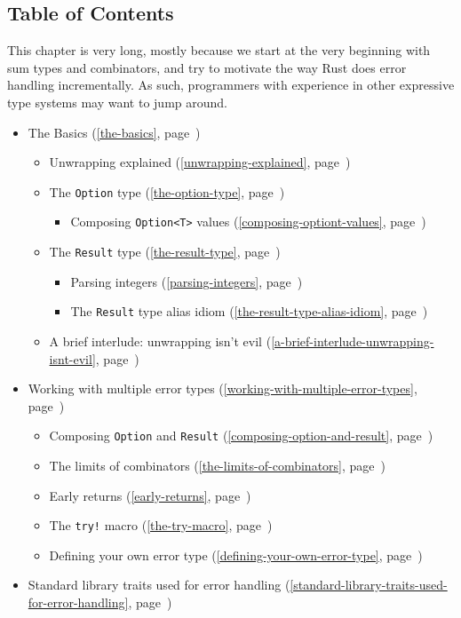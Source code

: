 \documentclass[a4paper,]{book}
\renewcommand*{\hyperref}[2][\ar]{%
  \def\ar{#2}%
  #2 (\autoref{#1}, page~\pageref{#1})}
\providecommand{\tightlist}{%
  \setlength{\itemsep}{0pt}\setlength{\parskip}{0pt}}
\begin{document}
\subsection{Table of Contents}\label{table-of-contents}

This chapter is very long, mostly because we start at the very beginning
with sum types and combinators, and try to motivate the way Rust does
error handling incrementally. As such, programmers with experience in
other expressive type systems may want to jump around.

\begin{itemize}
\tightlist
\item
  \hyperref[the-basics]{The Basics}

  \begin{itemize}
  \tightlist
  \item
    \hyperref[unwrapping-explained]{Unwrapping explained}
  \item
    \hyperref[the-option-type]{The \texttt{Option} type}

    \begin{itemize}
    \tightlist
    \item
      \hyperref[composing-optiont-values]{Composing
      \texttt{Option\textless{}T\textgreater{}} values}
    \end{itemize}
  \item
    \hyperref[the-result-type]{The \texttt{Result} type}

    \begin{itemize}
    \tightlist
    \item
      \hyperref[parsing-integers]{Parsing integers}
    \item
      \hyperref[the-result-type-alias-idiom]{The \texttt{Result} type
      alias idiom}
    \end{itemize}
  \item
    \hyperref[a-brief-interlude-unwrapping-isnt-evil]{A brief interlude:
    unwrapping isn't evil}
  \end{itemize}
\item
  \hyperref[working-with-multiple-error-types]{Working with multiple
  error types}

  \begin{itemize}
  \tightlist
  \item
    \hyperref[composing-option-and-result]{Composing \texttt{Option} and
    \texttt{Result}}
  \item
    \hyperref[the-limits-of-combinators]{The limits of combinators}
  \item
    \hyperref[early-returns]{Early returns}
  \item
    \hyperref[the-try-macro]{The \texttt{try!} macro}
  \item
    \hyperref[defining-your-own-error-type]{Defining your own error
    type}
  \end{itemize}
\item
  \hyperref[standard-library-traits-used-for-error-handling]{Standard
  library traits used for error handling}


\end{itemize}
\end{document}

